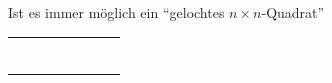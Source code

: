 \begin{example}
\begin{remark}
%
%
%
%
%
%
\end{remark}
\end{example}


\begin{example}\label{bsp:plättli}
Ist es immer möglich ein ``gelochtes $n\times n$-Quadrat''
\begin{center}
\begin{tabular}{ | c | c | c | c | c  | c | c | c | }
\hline
&&&&&&&\\
\hline
&&&&&&&\\
\hline
&&&&&&&\\
\hline
&&&&&&&\\
\hline
&&&&&&\cellcolor{black}&\\
\hline
&&&&&&&\\
\hline
&&&&&&&\\
\hline
&&&&&&&\\
\hline
\end{tabular}
\end{center}


\end{example}
